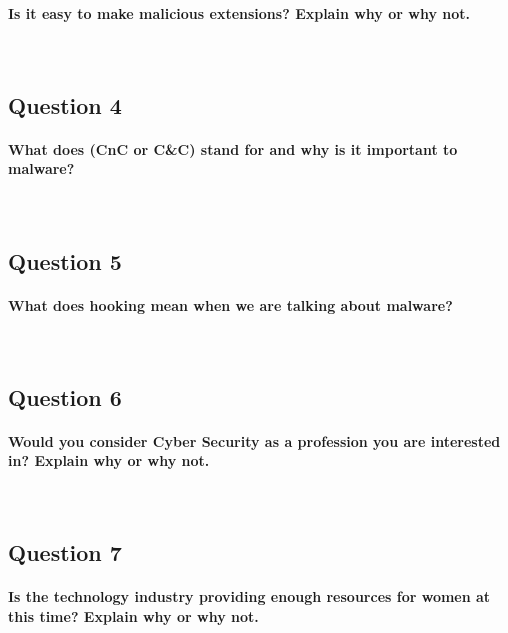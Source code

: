 \documentclass{article}
\begin{document}
\paragraph{Is it easy to make malicious extensions? Explain why or why not.}\mbox{}\\
\newline
\framebox[\textwidth]{\rule{0pt}{80pt}}

\pagebreak

\subsection{Question 4}
\paragraph{What does (CnC or C\&C) stand for and why is it important to malware?}\mbox{}\\
\newline
\framebox[\textwidth]{\rule{0pt}{80pt}}

\subsection{Question 5}
\paragraph{What does hooking mean when we are talking about malware?}\mbox{}\\
\newline
\framebox[\textwidth]{\rule{0pt}{80pt}}

\subsection{Question 6}
\paragraph{Would you consider Cyber Security as a profession you are interested in? Explain why or why not.}\mbox{}\\
\newline
\framebox[\textwidth]{\rule{0pt}{80pt}}

\pagebreak

\subsection{Question 7}
\paragraph{Is the technology industry providing enough resources for women at this time? Explain why or why not.}\mbox{}\\
\newline
\framebox[\textwidth]{\rule{0pt}{80pt}}
\end{document}
